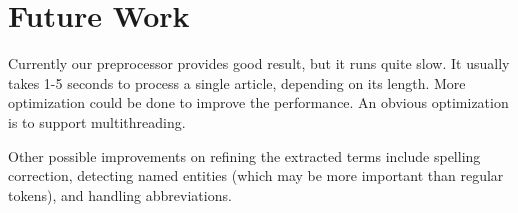 \documentclass{article}
\begin{document}
\section{Future Work}
Currently our preprocessor provides good result, but it runs quite
slow. It usually takes 1-5 seconds to process a single article, depending on
its length. More optimization could be done to improve the performance. An
obvious optimization is to support multithreading.

Other possible improvements on refining the extracted terms include spelling
correction, detecting named entities (which may be more important than regular
tokens), and handling abbreviations.

\end{document}

